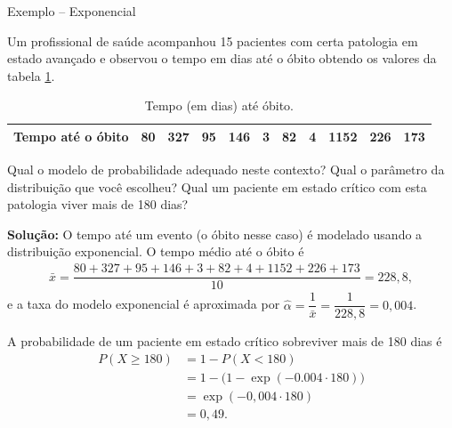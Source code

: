 \documentclass[8pt]{beamer}
\begin{document}
\begin{frame}{Exemplo -- Exponencial}

{\scriptsize
 Um profissional de saúde acompanhou 15 pacientes com certa patologia em estado avançado e observou o tempo em dias até o óbito obtendo os valores da tabela \ref{tab:exe_exp}.
 \begin{table}[ht]
\centering
\begin{tabular}{c|cccccccccc}
  \toprule[0.05cm]
Tempo até o óbito & 80 & 327 & 95 & 146 & 3 & 82 & 4 & 1152 & 226 & 173 \\ 
   \bottomrule[0.05cm]
\end{tabular}
\caption{Tempo (em dias) até óbito.} 
\label{tab:exe_exp}
\end{table}
Qual o modelo de probabilidade adequado neste contexto? Qual o parâmetro da distribuição que você escolheu? Qual um paciente em estado crítico com esta patologia viver mais de 180
dias?
\vfill

\textbf{Solução:} O tempo até um evento (o óbito nesse caso) é modelado usando a distribuição exponencial. O tempo médio até o óbito é 
\begin{align*}
 \bar{x} = \dfrac{80 + 327 + 95 + 146 + 3 + 82 + 4 + 1152 + 226 + 173}{10} = 228,8,
\end{align*}
e a taxa do modelo exponencial é aproximada por $\hat{\alpha} = \dfrac{1}{\bar{x}} = \dfrac{1}{228,8} = 0,004$.

A probabilidade de um paciente em estado crítico sobreviver mais de 180 dias é 
\begin{align*}
 P(X \geq 180) &= 1 - P(X < 180) \\
 &= 1 -\Big(1- \exp(-0.004\cdot 180)\Big)\\
 &= \exp(-0,004\cdot 180)\\
 &= 0,49.
\end{align*}
}
\end{frame}
\end{document}
